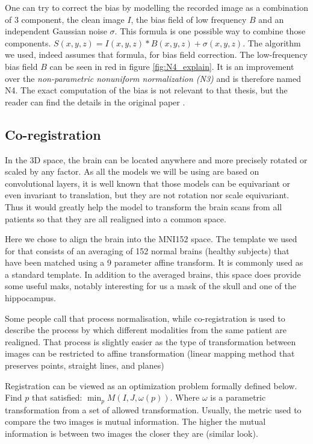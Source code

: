 One can try to correct the bias by modelling the recorded image as a combination of 3 component, the clean image $I$, the bias field of low frequency $B$ and an independent Gaussian noise $\sigma$. This formula is one possible way to combine those components. $S(x,y,z)= I(x,y,z)*B(x,y,z) +\sigma(x,y,z)$. The algorithm we used, indeed assumes that formula, for bias field correction. The low-frequency bias field $B$ can be seen in red in figure \ref{fig:N4_explain}. It is an improvement over the \textit{non-parametric nonuniform normalization (N3)} and is therefore named N4. 
The exact computation of the bias is not relevant to that thesis, but the reader can find the details in the original paper \cite{N4_paper}.


\subsection{Co-registration}
\label{sec:coregistration}

In the 3D space, the brain can be located anywhere and more precisely rotated or scaled by any factor. As all the models we will be using are based on convolutional layers, it is well known that those models can be equivariant or even invariant to translation, but they are not rotation nor scale equivariant. Thus it would greatly help the model to transform the brain scans from all patients so that they are all realigned into a common space. 

Here we chose to align the brain into the MNI152 space\footnotemark{}. The template we used for that consists of an averaging of 152 normal brains (healthy subjects) that have been matched using a 9 parameter affine transform. It is commonly used as a standard template. In addition to the averaged brains, this space does provide some useful maks, notably interesting for us a mask of the skull and one of the hippocampus.

Some people call that process normalisation, while co-registration is used to describe the process by which different modalities from the same patient are realigned. That process is slightly easier as the type of transformation between images can be restricted to affine transformation (linear mapping method that preserves points, straight lines, and planes)

Registration can be viewed as an optimization problem formally defined below.
Find $p$ that satisfied:  $\displaystyle  \min_{p} M(I,J, \omega(p))$. Where $\omega$ is a parametric transformation from a set of allowed transformation. Usually, the metric used to compare the two images is mutual information. The higher the mutual information is between two images the closer they are (similar look).

